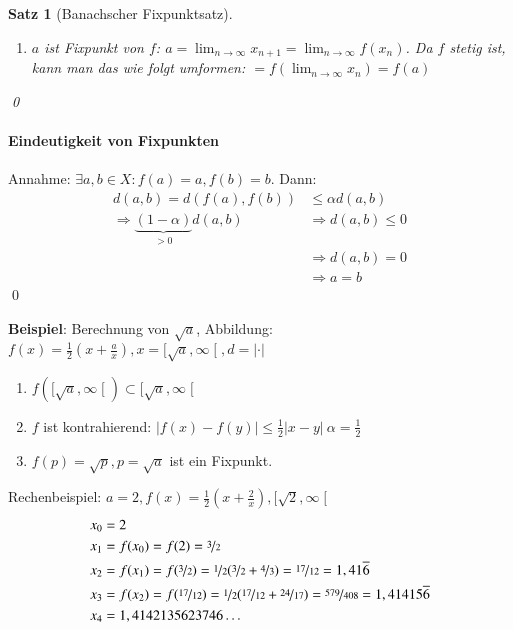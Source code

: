 \documentclass[ngerman,titlepage,twoside, parskip=half*]{scrreprt}
\theoremstyle{plain}
\newtheorem{theorem}{Satz}[section]
\theoremstyle{definition}
\theoremstyle{remark}
\newcommand*{\rsofint}[1]{[#1\mathclose{[}}  %
\begin{document}
\begin{theorem}[Banachscher
  Fixpunktsatz]
\begin{enumerate}[1. Schr{i}tt]
    ist bekannt, dass $X$ vollständig ist. Dies bedingt, dass ein $a\in X$ existiert, für das $\lim x_n=a$ ist. Wegen
    der Dreiecksungleichung $|d(a,x_m)-d(x_m,x_n)|\leq d(a,x_n)$ ergibt sich für $n\rightarrow \infty$, dass
    $d(a,x_n)\rightarrow 0\Rightarrow d(a,x_m)=\lim_{n\rightarrow\infty} d(x_n,x_m)\leq \frac{\alpha^m}{1-\alpha}
    d(x_1,x_0)$. Diese Formel impliziert die Fehlerabschätzung.
  \item $a$ ist Fixpunkt von $f$: $a=\lim_{n\rightarrow\infty}x_{n+1}=\lim_{n\rightarrow\infty} f(x_n)$. Da $f$ stetig
  ist, kann man das wie folgt umformen: $=f(\lim_{n\rightarrow\infty} x_n)=f(a)$
\end{enumerate}
\qed
\end{theorem}

\paragraph{Eindeutigkeit von Fixpunkten}
Annahme: $\exists a,b\in X\colon f(a)=a,f(b)=b$. Dann:
\begin{align*}
  d(a,b)=d(f(a),f(b)) & \leq \alpha d(a,b)\\
  \Rightarrow \underbrace{(1-\alpha)}_{>0}d(a,b)& \Rightarrow d(a,b)\leq 0\\
  & \Rightarrow d(a,b)=0\\
  & \Rightarrow a=b
\end{align*}
\qed

\textbf{Beispiel}: Berechnung von $\sqrt{a}$, Abbildung: $f(x)=\frac{1}{2}(x+\frac{a}{x}),
x=\rsofint{\sqrt{a},\infty}, d=|\cdot |$
\begin{enumerate}
  \item $f(\rsofint{\sqrt{a},\infty})\subset \rsofint{\sqrt{a},\infty}$
  \item $f$ ist kontrahierend: $|f(x)-f(y)|\leq \frac{1}{2}|x-y|\ \alpha=\frac{1}{2}$
  \item $f(p)=\sqrt{p}, p=\sqrt{a}$ ist ein Fixpunkt.
\end{enumerate}
Rechenbeispiel: $a=2, f(x)=\frac{1}{2}(x+\frac{2}{x}), \rsofint{\sqrt{2},\infty}$
\begin{align*}
  x_0 & = 2\\
  x_1 & = f(x_0)=f(2)=\nicefrac{3}{2}\\
  x_2 & = f(x_1)= f(\nicefrac{3}{2})= \nicefrac{1}{2} (\nicefrac{3}{2}
  +\nicefrac{4}{3})=\nicefrac{17}{12}=1,41\overline{6}\\
  x_3 & = f(x_2)= f(\nicefrac{17}{12})= \nicefrac{1}{2}
  (\nicefrac{17}{12} +\nicefrac{24}{17})= \nicefrac{579}{408}=
  1,41415\overline{6}\\
  x_4 & = 1,4142135623746\ldots
\end{align*}
\end{document}
